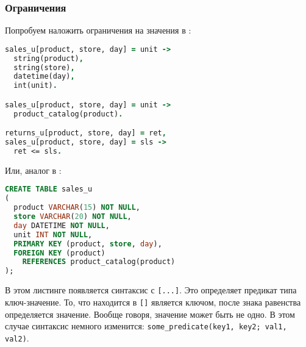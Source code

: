\subsubsection{Ограничения}
\label{sec:technology:logiql:constraints}

Попробуем наложить ограничения на значения в \logiql:

\begin{lstlisting}[language=Prolog]
sales_u[product, store, day] = unit ->
  string(product),
  string(store),
  datetime(day),
  int(unit).

sales_u[product, store, day] = unit ->
  product_catalog(product).

returns_u[product, store, day] = ret,
sales_u[product, store, day] = sls ->
  ret <= sls.
\end{lstlisting}

Или, аналог в \sql:

\begin{lstlisting}[language=SQL]
CREATE TABLE sales_u
(
  product VARCHAR(15) NOT NULL,
  store VARCHAR(20) NOT NULL,
  day DATETIME NOT NULL,
  unit INT NOT NULL,
  PRIMARY KEY (product, store, day),
  FOREIGN KEY (product)
    REFERENCES product_catalog(product)
);
\end{lstlisting}

В этом листинге появляется синтаксис с \lstinline{[...]}. Это определяет предикат типа ключ-значение. То, что находится в \lstinline{[]} является ключом, после знака равенства определяется значение. Вообще говоря, значение может быть не одно. В этом случае синтаксис немного изменится: \lstinline{some_predicate(key1, key2; val1, val2)}.

